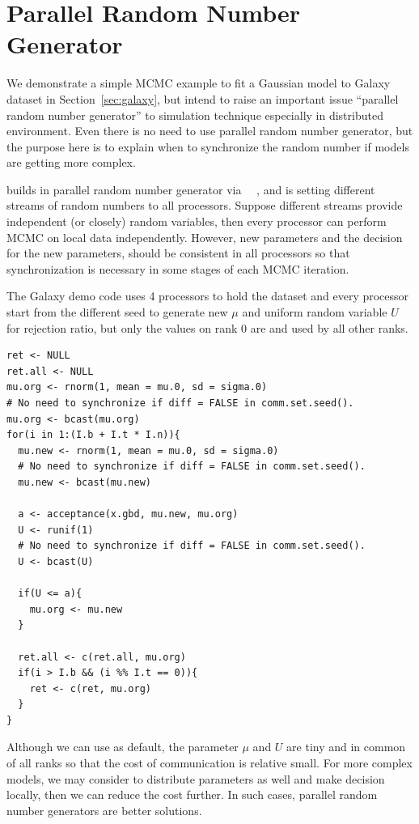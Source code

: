 \section{Parallel Random Number Generator}
\label{sec:prng}

We demonstrate a simple MCMC example to fit a
Gaussian model to Galaxy dataset in Section~\ref{sec:galaxy}, but
intend to raise an important issue ``parallel random number generator''
to simulation technique especially in distributed environment.
Even there is no need to use parallel random number generator, but the
purpose here is to explain when to synchronize the random number
if models are getting more complex.

 builds in parallel random number generator via
~\citep{rlecuyer}~,
and  is setting different
streams of random numbers to all processors. Suppose different streams
provide independent (or closely) random variables, then every processor
can perform MCMC on local data independently. However,
new parameters and the decision for the new parameters,
should be consistent in all processors so that synchronization is necessary
in some stages of each MCMC iteration.

The Galaxy demo code uses 4 processors to
hold the dataset and every processor start from the different seed to generate
new $\mu$ and uniform random variable $U$ for rejection ratio, but only the
values on rank 0 are  and used by all other ranks.
\begin{lstlisting}[language=rr,title=Hastings-Metropolis MCMC]
ret <- NULL
ret.all <- NULL
mu.org <- rnorm(1, mean = mu.0, sd = sigma.0)
# No need to synchronize if diff = FALSE in comm.set.seed().
mu.org <- bcast(mu.org)
for(i in 1:(I.b + I.t * I.n)){
  mu.new <- rnorm(1, mean = mu.0, sd = sigma.0)
  # No need to synchronize if diff = FALSE in comm.set.seed().
  mu.new <- bcast(mu.new)

  a <- acceptance(x.gbd, mu.new, mu.org)
  U <- runif(1)
  # No need to synchronize if diff = FALSE in comm.set.seed().
  U <- bcast(U)

  if(U <= a){
    mu.org <- mu.new
  }

  ret.all <- c(ret.all, mu.org)
  if(i > I.b && (i %% I.t == 0)){
    ret <- c(ret, mu.org)
  }
}
\end{lstlisting}
Although we can use  as default,
the parameter $\mu$ and $U$ are tiny and in common of all ranks so that
the cost of communication is relative small. For more complex models,
we may consider to distribute parameters as well and make decision locally,
then we can reduce the cost further. In such cases, parallel random
number generators are better solutions.



